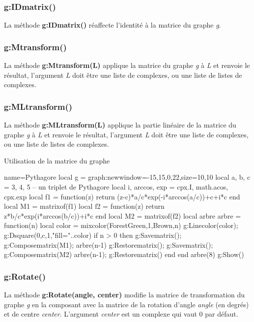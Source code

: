 \subsubsection{g:IDmatrix()}
La méthode \textbf{g:IDmatrix()} réaffecte l'identité à la matrice du graphe \emph g.

\subsubsection{g:Mtransform()}
La méthode \textbf{g:Mtransform(L)} applique la matrice du graphe \emph g à \emph{L} et renvoie le résultat, l'argument \emph L doit être une liste de complexes, ou une liste de listes de complexes.

\subsubsection{g:MLtransform()}
La méthode \textbf{g:MLtransform(L)} applique la partie linéaire de la matrice du graphe \emph g à \emph{L} et renvoie le résultat, l'argument \emph L doit être une liste de complexes, ou une liste de listes de complexes.

\begin{demo}{Utilisation de la matrice du graphe}
\begin{luadraw}{name=Pythagore}
local g = graph:new{window={-15,15,0,22},size={10,10}}
local a, b, c = 3, 4, 5 -- un triplet de Pythagore
local i, arccos, exp = cpx.I, math.acos, cpx.exp
local f1 = function(z)
        return (z-c)*a/c*exp(-i*arccos(a/c))+c+i*c end
local M1 = matrixof(f1)
local f2 = function(z)
        return z*b/c*exp(i*arccos(b/c))+i*c end
local M2 = matrixof(f2)
local arbre
arbre = function(n)
    local color = mixcolor(ForestGreen,1,Brown,n)
    g:Linecolor(color); g:Dsquare(0,c,1,"fill="..color)
    if n > 0 then
        g:Savematrix(); g:Composematrix(M1); arbre(n-1)
        g:Restorematrix(); g:Savematrix(); g:Composematrix(M2)
        arbre(n-1); g:Restorematrix()
    end
end
arbre(8)
g:Show()
\end{luadraw}
\end{demo}


\subsubsection{g:Rotate()}
La méthode \textbf{g:Rotate(angle, center)} modifie la matrice de transformation du graphe \emph g en la composant avec la matrice de la rotation d'angle \emph{angle} (en degrés) et de centre \emph{center}. L'argument \emph{center} est un complexe qui vaut $0$ par défaut.


